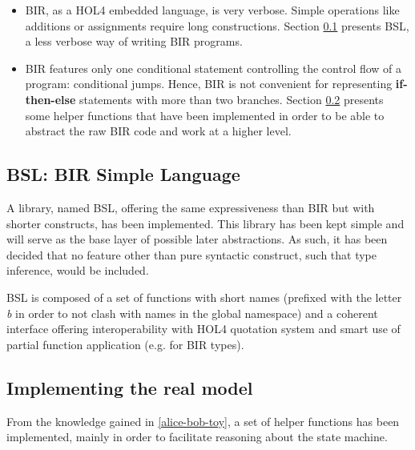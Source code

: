 \documentclass[10pt,a4paper]{article}
\begin{document}
\begin{multicols}{2}
\begin{itemize}
    \item BIR, as a HOL4 embedded language, is very verbose. Simple operations like additions or assignments require long constructions. Section \ref{bsl} presents BSL, a less verbose way of writing BIR programs.
    \item BIR features only one conditional statement controlling the control flow of a program: conditional jumps. Hence, BIR is not convenient for representing \textbf{if-then-else} statements with more than two branches. Section \ref{impl-real-model} presents some helper functions that have been implemented in order to be able to abstract the raw BIR code and work at a higher level.
\end{itemize}

\subsection{BSL: BIR Simple Language} \label{bsl}

A library, named BSL, offering the same expressiveness than BIR but with shorter constructs, has been implemented. This library has been kept simple and will serve as the base layer of possible later abstractions. As such, it has been decided that no feature other than pure syntactic construct, such that type inference, would be included.

BSL is composed of a set of functions with short names (prefixed with the letter \textit{b} in order to not clash with names in the global namespace) and a coherent interface offering interoperability with HOL4 quotation system and smart use of partial function application (e.g. for BIR types).

\subsection{Implementing the real model} \label{impl-real-model}

From the knowledge gained in \ref{alice-bob-toy}, a set of helper functions has been implemented, mainly in order to facilitate reasoning about the state machine.


\end{multicols}
\end{document}
